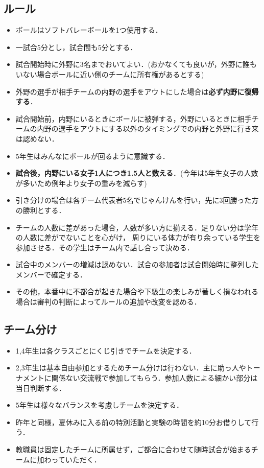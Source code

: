 \documentclass[dvipdfmx]{jsarticle}
\begin{document}
\subsection{ルール}
\begin{itemize}
  \item ボールはソフトバレーボールを1つ使用する．
  \item 一試合5分とし，試合間も5分とする．
  \item 試合開始時に外野に3名までおいてよい．(おかなくても良いが，外野に誰もいない場合ボールに近い側のチームに所有権があるとする)
  \item 外野の選手が相手チームの内野の選手をアウトにした場合は{\bf 必ず内野に復帰する}．
  \item 試合開始前，内野にいるときにボールに被弾する，外野にいるときに相手チームの内野の選手をアウトにする以外のタイミングでの内野と外野に行き来は認めない．
  \item 5年生はみんなにボールが回るように意識する．
  \item {\bf 試合後，内野にいる女子1人につき1.5人と数える}．(今年は5年生女子の人数が多いため例年より女子の重みを減らす)
  \item 引き分けの場合は各チーム代表者5名でじゃんけんを行い，先に3回勝った方の勝利とする．
  \item チームの人数に差があった場合，人数が多い方に揃える．足りない分は学年の人数に差がでないことを心がけ，
        周りにいる体力が有り余っている学生を参加させる．その学生はチーム内で話し合って決める．
  \item 試合中のメンバーの増減は認めない．試合の参加者は試合開始時に整列したメンバーで確定する．
  \item その他，本番中に不都合が起きた場合や下級生の楽しみが著しく損なわれる場合は審判の判断によってルールの追加や改変を認める．
\end{itemize}

\subsection{チーム分け}\label{team}
\begin{itemize}
  \item 1,4年生は各クラスごとにくじ引きでチームを決定する．
  \item 2,3年生は基本自由参加とするためチーム分けは行わない．主に助っ人やトーナメントに関係ない交流戦で参加してもらう．参加人数による細かい部分は当日判断する．
  \item 5年生は様々なバランスを考慮しチームを決定する．
  \item 昨年と同様，夏休みに入る前の特別活動と実験の時間を約10分お借りして行う．
  \item 教職員は固定したチームに所属せず，ご都合に合わせて随時試合が始まるチームに加わっていただく．
\end{itemize}
\end{document}
